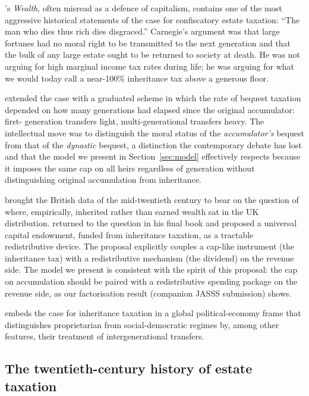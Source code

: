 \documentclass[11pt]{article}
\begin{document}
\citet{carnegie1889wealth}'s \emph{Wealth}, often misread as a
defence of capitalism, contains one of the most aggressive
historical statements of the case for confiscatory estate taxation:
``The man who dies thus rich dies disgraced.''  Carnegie's argument
was that large fortunes had no moral right to be transmitted to the
next generation and that the bulk of any large estate ought to be
returned to society at death.  He was not arguing for high marginal
income tax rates during life; he was arguing for what we would
today call a near-100\% inheritance tax above a generous floor.

\citet{rignano1924bequest} extended the case with a graduated scheme
in which the rate of bequest taxation depended on how many
generations had elapsed since the original accumulator: first-
generation transfers light, multi-generational transfers heavy.
The intellectual move was to distinguish the moral status of the
\emph{accumulator's} bequest from that of the \emph{dynastic}
bequest, a distinction the contemporary debate has lost and that
the model we present in Section~\ref{sec:model} effectively respects
because it imposes the same cap on all heirs regardless of generation
without distinguishing original accumulation from inheritance.

\citet{atkinson1972unequal} brought the British data of the
mid-twentieth century to bear on the question of where, empirically,
inherited rather than earned wealth sat in the UK distribution.
\citet{atkinson2015inequality} returned to the question in his final
book and proposed a universal capital endowment, funded from
inheritance taxation, as a tractable redistributive device.  The
proposal explicitly couples a cap-like instrument (the inheritance
tax) with a redistributive mechanism (the dividend) on the revenue
side.  The model we present is consistent with the spirit of this
proposal: the cap on accumulation should be paired with a
redistributive spending package on the revenue side, as our
factorisation result (companion JASSS submission) shows.

\citet{piketty2020capital} embeds the case for inheritance taxation
in a global political-economy frame that distinguishes proprietarian
from social-democratic regimes by, among other features, their
treatment of intergenerational transfers.

\subsection{The twentieth-century history of estate taxation}
\end{document}
